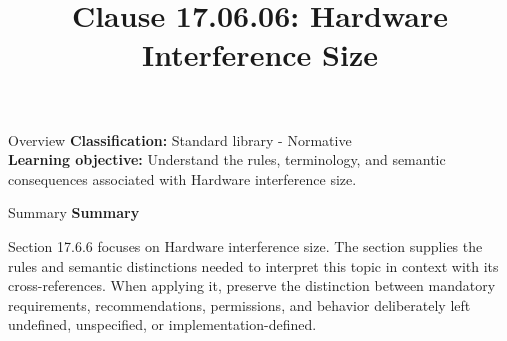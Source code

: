 \documentclass[10pt,letterpaper]{article}
\title{Clause 17.06.06: Hardware Interference Size}
\author{}
\date{}
\begin{document}
\maketitle
\begin{CornellOverviewBox}{Overview}
\textbf{Classification:} Standard library - Normative\\[2pt]
\textbf{Learning objective:} Understand the rules, terminology, and semantic consequences associated with Hardware interference size.
\end{CornellOverviewBox}\begin{CornellSummaryBox}{Summary}
{\sffamily\bfseries\color{Accent} Summary}\par\vspace{3pt}Section 17.6.6 focuses on Hardware interference size. The section supplies the rules and semantic distinctions needed to interpret this topic in context with its cross-references. When applying it, preserve the distinction between mandatory requirements, recommendations, permissions, and behavior deliberately left undefined, unspecified, or implementation-defined.
\end{CornellSummaryBox}
\end{document}
